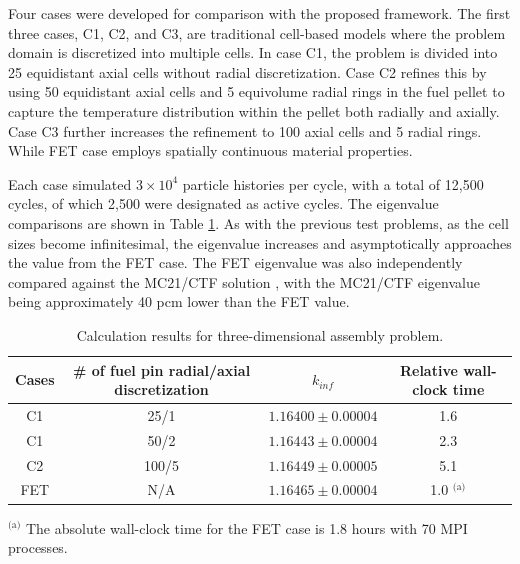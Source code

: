Four cases were developed for comparison with the proposed framework. The first three cases, C1, C2, and C3, are traditional cell-based models where the problem domain is discretized into multiple cells. In case C1, the problem is divided into 25 equidistant axial cells without radial discretization. Case C2 refines this by using 50 equidistant axial cells and 5 equivolume radial rings in the fuel pellet to capture the temperature distribution within the pellet both radially and axially. Case C3 further increases the refinement to 100 axial cells and 5 radial rings. While FET case employs spatially continuous material properties.

Each case simulated $3 \times 10^4$ particle histories per cycle, with a total of 12,500 cycles, of which 2,500 were designated as active cycles. The eigenvalue comparisons are shown in Table \ref{tab31}. As with the previous test problems, as the cell sizes become infinitesimal, the eigenvalue increases and asymptotically approaches the value from the FET case. The FET eigenvalue was also independently compared against the MC21/CTF solution \cite{kelly_2017}, with the MC21/CTF eigenvalue being approximately 40 pcm lower than the FET value.

\begin{table}
    \centering
    \caption{Calculation results for three-dimensional assembly problem.}
    \label{tab31} 
    \begin{tabular}{| c | c | c | c | }
    \hline 
     Cases & \# of fuel pin radial/axial discretization & $k_{inf}$ & Relative wall-clock time \\
     \hline
     C1     & 25/1  & $1.16400\pm0.00004$ & 1.6      \\ \hline
     C1     & 50/2  & $1.16443\pm0.00004$ & 2.3      \\ \hline
     C2     & 100/5 & $1.16449\pm0.00005$ & 5.1      \\ \hline
     FET    & N/A   & $1.16465\pm0.00004$ & 1.0 $^\text{(a)}$      \\ \hline
    \end{tabular}
    \begin{flushleft}
        \small
        $^\text{(a)}$ The absolute wall-clock time for the FET case is 1.8 hours with 70 MPI processes. \\
    \end{flushleft}
\end{table}

